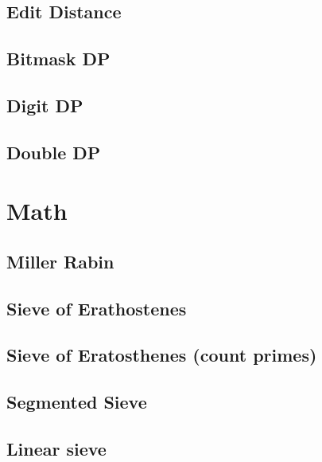 \documentclass[10pt]{article}
\begin{document}
\begin{multicols*}{2}
\subsection{Edit Distance}


\subsection{Bitmask DP}


\subsection{Digit DP}


\subsection{Double DP}


\section{Math}

\subsection{Miller Rabin }


\subsection{Sieve of Erathostenes}


\subsection{Sieve of Eratosthenes (count primes)}

\subsection{Segmented Sieve}

\subsection{Linear sieve}



\end{multicols*}
\end{document}
